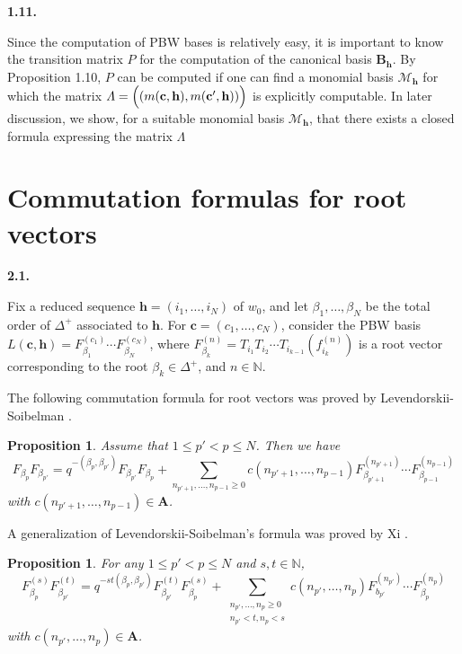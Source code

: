 \documentclass[12pt]{amsart}
\renewcommand\b{\beta}
\newcommand\vD{\varDelta}
\newcommand\vL{\varLambda}
\renewcommand{\1}{\mathbb 1}
\newcommand{\NN}{\mathbb N}
\newcommand\BA{\mathbf A}
\newcommand\bB{\mathbf B}
\newcommand\Bh{\mathbf h}
\newcommand\Bc{\mathbf c}
\newcommand\SM{\mathscr{M}}
\numberwithin{equation}{section}
\newtheorem{prop}[thm]{Proposition}
\def \para#1{\par\medskip\textbf{#1}
              \addtocounter{thm}{1}}
\begin{document}
\para{1.11.}
Since the computation of PBW bases is relatively easy, it is important to know
the transition matrix $P$ for the computation of the canonical basis $\bB_{\Bh}$.
By Proposition 1.10, $P$ can be computed if one can
find a monomial basis $\SM_{\Bh}$ for which the matrix
$\vL = \Bigl((m(\Bc,\Bh), m(\Bc',\Bh))\Bigr)$ is explicitly computable. 
In later discussion, we show,  for a suitable  monomial basis $\SM_{\Bh}$,
that there exists a closed formula expressing the matrix $\vL$


\par\bigskip
\section { Commutation formulas for root vectors }
\para{2.1.}
Fix a reduced sequence $\Bh = (i_1, \dots, i_N)$ of $w_0$, and
let $\b_1, \dots, \b_N$ be the total order of $\vD^+$ associated to $\Bh$. 
For $\Bc = (c_1, \dots, c_N)$,
consider the PBW basis $L(\Bc, \Bh) = F_{\b_1}^{(c_1)}\cdots F_{\b_N}^{(c_N)}$,
where $F_{\b_k}^{(n)} = T_{i_1}T_{i_2}\cdots T_{i_{k-1}}(f_{i_k}^{(n)})$
is a root vector corresponding to the root $\b_k \in \vD^+$, and $n \in \NN$. 

\par
The following commutation formula for root vectors
was proved by Levendorskii-Soibelman \cite{LS}.

\begin{prop}  %
Assume that $1 \le p' < p \le N$. Then we have 
\begin{equation*}
  F_{\b_p}F_{\b_{p'}} = q^{-(\b_p, \b_{p'})}F_{\b_{p'}}F_{\b_p}
  + \sum_{n_{p'+1}, \dots, n_{p-1} \ge 0}c(n_{p'+1}, \dots, n_{p-1})
           F_{\b_{p'+1}}^{(n_{p'+1})}\cdots F_{\b_{p-1}}^{(n_{p-1})} 
\end{equation*}
with $c(n_{p'+1}, \dots, n_{p-1}) \in \BA$. 
\end{prop}  

A generalization of Levendorskii-Soibelman's formula was proved by
Xi \cite{X1}. 

\begin{prop}  %
  For any $1 \le p' < p \le N$ and $s, t \in \NN$,
\begin{equation*}
  F_{\b_p}^{(s)}F_{\b_{p'}}^{(t)} = q^{-st(\b_p,\b_{p'})}F_{\b_{p'}}^{(t)}F_{\b_p}^{(s)}
        + \sum_{\substack{n_{p'}, \dots, n_p \ge 0 \\
            n_{p'} < t, n_p < s}}c(n_{p'}, \dots, n_p)
               F_{b_{p'}}^{(n_{p'})}\cdots F_{\b_p}^{(n_p)} 
\end{equation*}
with $c(n_{p'}, \dots, n_p) \in \BA$. 
\end{prop}
\end{document}
